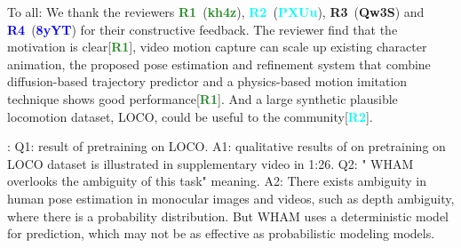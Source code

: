 \renewcommand{\paragraph}[1]{\medskip\noindent\textbf{#1}}
\newcommand{\Rone}{\textcolor{ForestGreen}{\textbf{R1}}}
\newcommand{\Rtwo}{\textcolor{Cyan}{\textbf{R2}}}
\newcommand{\Rthree}{\textcolor{YellowOrange}{\textbf{R3}}}
\newcommand{\Rfour}{\textcolor{Blue}{\textbf{R4}}}

\newcommand{\RoneH}{\textcolor{ForestGreen}{\textbf{kh4z}}}
\newcommand{\RtwoH}{\textcolor{Cyan}{\textbf{PXUu}}}
\newcommand{\RthreeH}{\textcolor{YellowOrange}{\textbf{Qw3S}}}
\newcommand{\RfourH}{\textcolor{Blue}{\textbf{8yYT}}}

\newcommand{\RoneC}[1]{{\color{ForestGreen}#1}}
\newcommand{\RtwoC}[1]{{\color{Cyan}#1}}
\newcommand{\RthreeC}[1]{{\color{YellowOrange}#1}}
\newcommand{\RfourC}[1]{{\color{Blue}#1}}


\noindent To all: We thank the reviewers \Rone~(\RoneH), \Rtwo~(\RtwoH), \Rthree~(\RthreeH) and \Rfour~(\RfourH) for their constructive feedback. The reviewer find that the motivation is clear[\Rone], video motion capture can scale up existing character animation, the proposed pose estimation and refinement system that combine diffusion-based trajectory predictor and a physics-based motion imitation technique shows good performance[\Rone]. And a large synthetic plausible locomotion dataset, LOCO, could be useful to the community[\Rtwo].


\noindent \RoneC{Response to R1}: Q1: result of pretraining on LOCO. A1: qualitative results of on pretraining on LOCO dataset is illustrated in supplementary video in 1:26. Q2: " WHAM overlooks the ambiguity of this task" meaning. A2: There exists ambiguity in human pose estimation in monocular images and videos, such as depth ambiguity, where there is a probability distribution. But WHAM uses a deterministic model for prediction, which may not be as effective as probabilistic modeling models.


